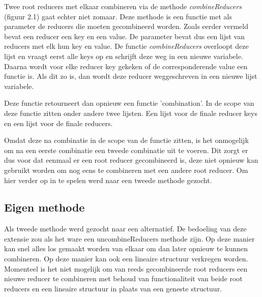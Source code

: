 Twee root reducers met elkaar combineren via de methode \textit{combineReducers} (figuur 2.1) gaat echter niet zomaar. Deze methode is een functie met als parameter de reducers die moeten gecombineerd worden. Zoals eerder vermeld bevat een reducer een key en een value. De parameter bevat dus een lijst van reducers met elk hun key en value. De functie \textit{combineReducers} overloopt deze lijst en vraagt eerst alle keys op en schrijft deze weg in een nieuwe variabele. Daarna wordt voor elke reducer key gekeken of de corresponderende value een functie is. Als dit zo is, dan wordt deze reducer weggeschreven in een nieuwe lijst variabele.   

Deze functie retourneert dan opnieuw een functie 'combination'. In de scope van deze functie zitten onder andere twee lijsten. Een lijst voor de finale reducer keys en een lijst voor de finale reducers. 
 
Omdat deze na combinatie in de scope van de functie zitten, is het onmogelijk om na een eerste combinatie een tweede combinatie uit te voeren. Dit zorgt er dus voor dat eenmaal er een root reducer gecombineerd is, deze niet opnieuw kan gebruikt worden om nog eens te combineren met een andere root reducer. Om hier verder op in te spelen werd naar een tweede methode gezocht. 

\subsection{Eigen methode}
Als tweede methode werd gezocht naar een alternatief. De bedoeling van deze extensie zou als het ware een uncombineReducers methode zijn. Op deze manier kan snel alles los gemaakt worden van elkaar om dan later opnieuw te kunnen combineren. Op deze manier kan ook een lineaire structuur verkregen worden. Momenteel is het niet mogelijk om van reeds gecombineerde root reducers een nieuwe reducer te combineren met behoud van functionaliteit van beide root reducers en een lineaire structuur in plaats van een geneste structuur. 

